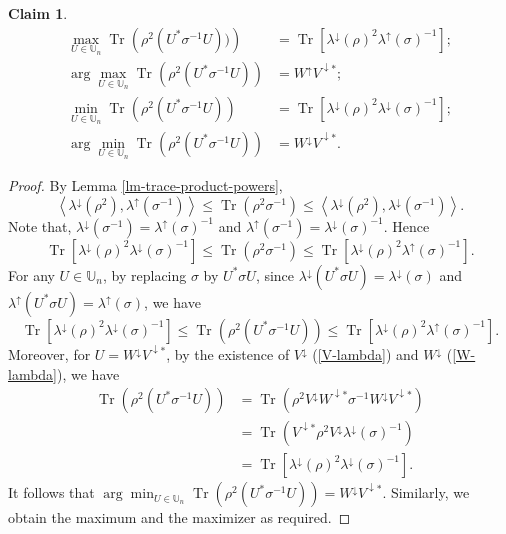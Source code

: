 \documentclass[10pt,reqno]{amsart}
\theoremstyle{break-italic}
\theoremstyle{break-italic}
\theoremstyle{break-italic}
\theoremstyle{break-italic}
\theoremstyle{break-italic}
\theoremstyle{break-italic}
\theoremstyle{break-italic}
\theoremstyle{break-italic}
\theoremstyle{break-roman}
\theoremstyle{standard}
\newtheorem{claim}[satz]{Claim}
\theoremstyle{varthm-roman}
\theoremstyle{varthm-italic}
\theoremstyle{varthm-roman-break}
\theoremstyle{varthm-italic-break}
\theoremstyle{varthm-roman-no-punctuation}
\theoremstyle{varthm-italic-no-punctuation}
\numberwithin{equation}{section}
\begin{document}
\begin{claim}\label{claimthuong}
\begin{align*}
\max_{U\in\mathbb U_n}\operatorname{Tr}\left(\rho^2(U^*\sigma^{-1}U))\right)&=\operatorname{Tr}\left[\lambda^\downarrow(\rho)^2\lambda^\uparrow(\sigma)^{-1}\right];\\
\arg\max_{U\in\mathbb U_n}\operatorname{Tr}\left(\rho^2(U^*\sigma^{-1}U)\right)&=W^\uparrow V^{\downarrow*};\\
\min_{U\in\mathbb U_n}\operatorname{Tr}\left(\rho^2(U^*\sigma^{-1}U)\right)&=\operatorname{Tr}\left[ \lambda^\downarrow(\rho)^2\lambda^\downarrow(\sigma)^{-1}\right];\\
\arg\min_{U\in\mathbb U_n}\operatorname{Tr}\left(\rho^2(U^*\sigma^{-1}U)\right)&=W^\downarrow V^{\downarrow*}.
\end{align*}
\end{claim}
\begin{proof}
By Lemma \ref{lm-trace-product-powers},
$$
\left< \lambda^\downarrow\left(\rho^2\right),\lambda^\uparrow\left(\sigma^{-1}\right) \right> \leq \operatorname{Tr}\left(\rho^2\sigma^{-1}\right) \leq \left< \lambda^\downarrow\left(\rho^2\right),\lambda^\downarrow\left(\sigma^{-1}\right) \right>.
$$
Note that, $\lambda^\downarrow(\sigma^{-1})=\lambda^\uparrow(\sigma)^{-1}$ and $\lambda^\uparrow(\sigma^{-1})=\lambda^\downarrow(\sigma)^{-1}$. 
Hence  
$$\operatorname{Tr}\left[ \lambda^\downarrow(\rho)^2\lambda^\downarrow(\sigma)^{-1}\right]  \leq \operatorname{Tr}(\rho^2\sigma^{-1}) \leq \operatorname{Tr}\left[\lambda^\downarrow(\rho)^2\lambda^\uparrow(\sigma)^{-1}\right].$$
For any $U\in\mathbb U_n$, by replacing $\sigma$ by $U^*\sigma U$, since  $\lambda^\downarrow(U^*\sigma U)=\lambda^\downarrow(\sigma)$ and $\lambda^\uparrow(U^*\sigma U) = \lambda^\uparrow(\sigma)$, we have 
$$\operatorname{Tr}\left[ \lambda^\downarrow(\rho)^2\lambda^\downarrow(\sigma)^{-1}\right] \leq \operatorname{Tr}\left(\rho^2\left(U^*\sigma^{-1}U\right)\right)\leq \operatorname{Tr}\left[\lambda^\downarrow(\rho)^2\lambda^\uparrow(\sigma)^{-1}\right]. $$
Moreover, for $U=W^\downarrow V^{\downarrow*}$, by the existence of $V^\downarrow$ (\ref{V-lambda}) and $W^\downarrow $ (\ref{W-lambda}), we have
\begin{align*}
\operatorname{Tr}\left(\rho^2\left(U^*\sigma^{-1}U\right)\right)&=\operatorname{Tr}(\rho^2V^{\downarrow}W^{\downarrow*}\sigma^{-1}W^\downarrow V^{\downarrow*})\\
&=\operatorname{Tr}\left(V^{\downarrow*}\rho^2V^{\downarrow}\lambda^\downarrow(\sigma)^{-1}\right)\\
&=\operatorname{Tr}\left[\lambda^\downarrow(\rho)^2\lambda^\downarrow(\sigma)^{-1} \right].
\end{align*}
It follows that $\arg\min_{U\in \mathbb U_n} \operatorname{Tr}\left(\rho^2\left(U^*\sigma^{-1}U\right)\right)=W^\downarrow V^{\downarrow*}$. Similarly, we obtain the maximum and the maximizer as required.
\end{proof}
\end{document}
